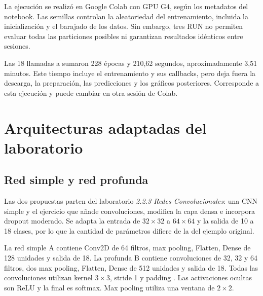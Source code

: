 \documentclass[11pt,letterpaper]{article}
\newcommand{\nombre}[1]{\texttt{\detokenize{#1}}}
\begin{document}
La ejecución se realizó en Google Colab con GPU G4, según los metadatos del notebook. Las semillas controlan la aleatoriedad del entrenamiento, incluida la inicialización y el barajado de los datos. Sin embargo, tres RUN no permiten evaluar todas las particiones posibles ni garantizan resultados idénticos entre sesiones.

Las 18 llamadas a \nombre{fit} sumaron 228 épocas y 210,62 segundos, aproximadamente 3,51 minutos. Este tiempo incluye el entrenamiento y sus callbacks, pero deja fuera la descarga, la preparación, las predicciones y los gráficos posteriores. Corresponde a esta ejecución y puede cambiar en otra sesión de Colab.

\section{Arquitecturas adaptadas del laboratorio}
\subsection{Red simple y red profunda}
Las dos propuestas parten del laboratorio \emph{2.2.3 Redes Convolucionales}: una CNN simple y el ejercicio que añade convoluciones, modifica la capa densa e incorpora dropout moderado. Se adapta la entrada de $32\times32$ a $64\times64$ y la salida de 10 a 18 clases, por lo que la cantidad de parámetros difiere de la del ejemplo original.

La red simple A contiene Conv2D de 64 filtros, max pooling, Flatten, Dense de 128 unidades y salida de 18. La profunda B contiene convoluciones de 32, 32 y 64 filtros, dos max pooling, Flatten, Dense de 512 unidades y salida de 18. Todas las convoluciones utilizan kernel $3\times3$, stride 1 y padding \nombre{valid}. Las activaciones ocultas son ReLU y la final es softmax. Max pooling utiliza una ventana de $2\times2$.
\end{document}
